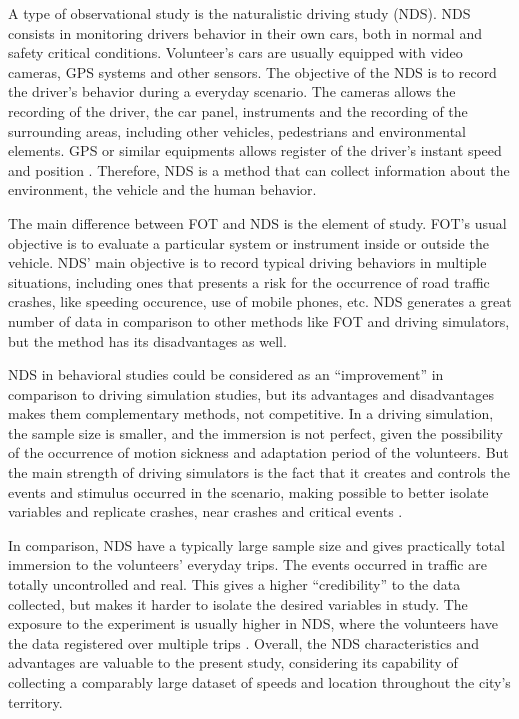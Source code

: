 A type of observational study is the naturalistic driving study (NDS). NDS consists in monitoring drivers behavior in their own cars, both in normal and safety critical conditions. Volunteer's cars are usually equipped with video cameras, GPS systems and other sensors. The objective of the NDS is to record the driver's behavior during a everyday scenario. The cameras allows the recording of the driver, the car panel, instruments and the recording of the surrounding areas, including other vehicles, pedestrians and environmental elements. GPS or similar equipments allows register of the driver's instant speed and position \cite{Shinar2017}. Therefore, NDS is a method that can collect information about the environment, the vehicle and the human behavior.

The main difference between FOT and NDS is the element of study. FOT's usual objective is to evaluate a particular system or instrument inside or outside the vehicle. NDS' main objective is to record typical driving behaviors in multiple situations, including ones that presents a risk for the occurrence of road traffic crashes, like speeding occurence, use of mobile phones, etc. NDS generates a great number of data in comparison to other methods like FOT and driving simulators, but the method has its disadvantages as well. 


NDS in behavioral studies could be considered as an ``improvement'' in comparison to driving simulation studies, but its advantages and disadvantages makes them complementary methods, not competitive. In a driving simulation, the sample size is smaller, and the immersion is not perfect, given the possibility of the occurrence of motion sickness and adaptation period of the volunteers. But the main strength of driving simulators is the fact that it creates and controls the events and stimulus occurred in the scenario, making possible to better isolate variables and replicate crashes, near crashes and critical events \cite{Shinar2017}.   

In comparison, NDS have a typically large sample size and gives practically total immersion to the volunteers' everyday trips. The events occurred in traffic are totally uncontrolled and real. This gives a higher ``credibility'' to the data collected, but makes it harder to isolate the desired variables in study. The exposure to the experiment is usually higher in NDS, where the volunteers have the data registered over multiple trips \cite{Carsten2013}. Overall, the NDS characteristics and advantages are valuable to the present study, considering its capability of collecting a comparably large dataset of speeds and location throughout the city's territory.

